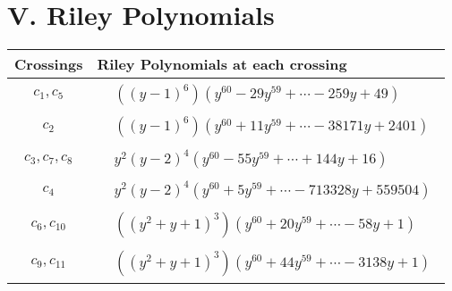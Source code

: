 \documentclass[1p]{elsarticle_modified}
\theoremstyle{definition}
\begin{document}
\centering \section*{ V. Riley Polynomials}
\begin{tabular}{m{50pt}|m{274pt}}
Crossings & \hspace{64pt}Riley Polynomials at each crossing \\
\hline $$\begin{aligned}c_{1},c_{5}\end{aligned}$$&$\begin{aligned}
&((y-1)^6)(y^{60}-29 y^{59}+\cdots-259 y+49)
\end{aligned}$\\
\hline $$\begin{aligned}c_{2}\end{aligned}$$&$\begin{aligned}
&((y-1)^6)(y^{60}+11 y^{59}+\cdots-38171 y+2401)
\end{aligned}$\\
\hline $$\begin{aligned}c_{3},c_{7},c_{8}\end{aligned}$$&$\begin{aligned}
&y^2(y-2)^4(y^{60}-55 y^{59}+\cdots+144 y+16)
\end{aligned}$\\
\hline $$\begin{aligned}c_{4}\end{aligned}$$&$\begin{aligned}
&y^2(y-2)^4(y^{60}+5 y^{59}+\cdots-713328 y+559504)
\end{aligned}$\\
\hline $$\begin{aligned}c_{6},c_{10}\end{aligned}$$&$\begin{aligned}
&((y^2+y+1)^3)(y^{60}+20 y^{59}+\cdots-58 y+1)
\end{aligned}$\\
\hline $$\begin{aligned}c_{9},c_{11}\end{aligned}$$&$\begin{aligned}
&((y^2+y+1)^3)(y^{60}+44 y^{59}+\cdots-3138 y+1)
\end{aligned}$\\
\hline
\end{tabular}
\vskip 2pc
\end{document}

